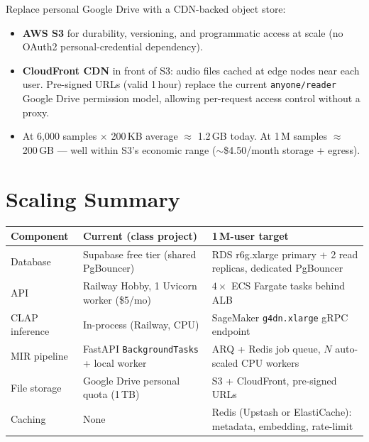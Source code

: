 \documentclass[12pt,letterpaper]{report}
\begin{document}
Replace personal Google Drive with a CDN-backed object store:

\begin{itemize}
  \item \textbf{AWS S3} for durability, versioning, and programmatic access at scale (no OAuth2 personal-credential dependency).
  \item \textbf{CloudFront CDN} in front of S3: audio files cached at edge nodes near each user. Pre-signed URLs (valid 1\,hour) replace the current \texttt{anyone/reader} Google Drive permission model, allowing per-request access control without a proxy.
  \item At 6{,}000 samples $\times$ 200\,KB average $\approx$ 1.2\,GB today. At 1\,M samples $\approx$ 200\,GB --- well within S3's economic range ($\sim$\$4.50/month storage + egress).
\end{itemize}

\section{Scaling Summary}

\begin{center}
\begin{tabularx}{\textwidth}{lXX}
\toprule
\textbf{Component} & \textbf{Current (class project)} & \textbf{1\,M-user target} \\
\midrule
Database     & Supabase free tier (shared PgBouncer)
             & RDS r6g.xlarge primary + 2 read replicas, dedicated PgBouncer \\
\addlinespace
API          & Railway Hobby, 1 Uvicorn worker (\$5/mo)
             & $4\times$ ECS Fargate tasks behind ALB \\
\addlinespace
CLAP inference & In-process (Railway, CPU)
               & SageMaker \texttt{g4dn.xlarge} gRPC endpoint \\
\addlinespace
MIR pipeline & FastAPI \texttt{BackgroundTasks} + local worker
             & ARQ + Redis job queue, $N$ auto-scaled CPU workers \\
\addlinespace
File storage & Google Drive personal quota (1\,TB)
             & S3 + CloudFront, pre-signed URLs \\
\addlinespace
Caching      & None
             & Redis (Upstash or ElastiCache): metadata, embedding, rate-limit \\
\bottomrule
\end{tabularx}
\end{center}
\end{document}
